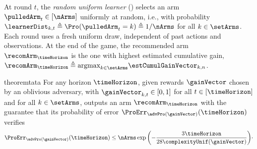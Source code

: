 At round $t$, the \emph{random uniform  learner} (\RULE{}) 
selects an arm $\pulledArm_t\in [\nArms]$ uniformly at random, i.e., 
with probability $\learnerDist_{k,t}\triangleq\Pro(\pulledArm_t=k)
\triangleq 1/\nArms$ for all $k\in\setArms$.
Each round uses a fresh uniform draw, independent of past actions and observations.
At the end of the game, the recommended 
arm $\recomArm_\timeHorizon$ is the one with highest 
estimated  
cumulative gain, 
$\recomArm_\timeHorizon \triangleq \argmax_{k\in\setArms}
\estCumulGainVector_{k,n}$. 
%
\begin{restatable}{theorem}{tata}\label{th:UPARU}
	For any horizon $\timeHorizon$, given rewards $\gainVector$ 
	chosen by an oblivious adversary, with $\gainVector_{k,t}\in [0,1]$ 
	for all $t\in[\timeHorizon]$ and for all $k\in\setArms$, \RULE{}  
	outputs an arm $\recomArm_\timeHorizon$
	with the guarantee that its probability of error 
	$\ProErr_{\advPro(\gainVector)}(\timeHorizon)$ verifies    
	\[
	\ProErr_{\advPro(\gainVector)}(\timeHorizon)
	\leq
	\nArms\exp\left(-\frac{3\timeHorizon}{28\complexityUnif(\gainVector)}\right)\!\cdot
	\]
\end{restatable}
%

